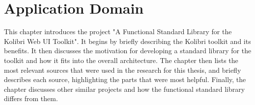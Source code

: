 \chapter{Application Domain}
\label{chap:theory}
This chapter introduces the project "A Functional Standard Library for the
Kolibri Web UI Toolkit". It begins by briefly describing the Kolibri toolkit
and its benefits. It then discusses the motivation for developing a standard
library for the toolkit and how it fits into the overall architecture. The
chapter then lists the most relevant sources that were used in the research for
this thesis, and briefly describes each source, highlighting the parts that
were most helpful. Finally, the chapter discusses other similar projects and
how the functional standard library differs from them.



